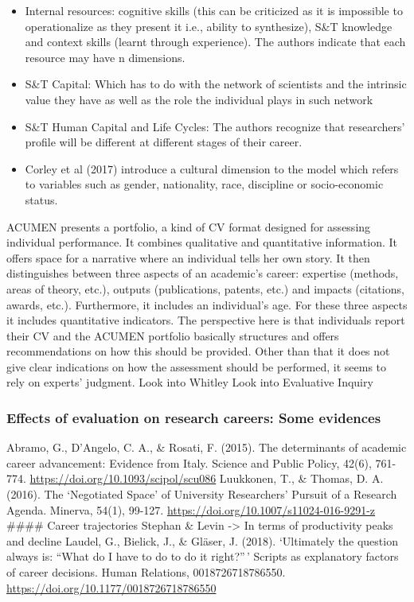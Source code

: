 \documentclass[]{article}
\providecommand{\tightlist}{%
  \setlength{\itemsep}{0pt}\setlength{\parskip}{0pt}}
\begin{document}
\begin{itemize}
\tightlist
\item
  Internal resources: cognitive skills (this can be criticized as it is
  impossible to operationalize as they present it i.e., ability to
  synthesize), S\&T knowledge and context skills (learnt through
  experience). The authors indicate that each resource may have n
  dimensions.
\item
  S\&T Capital: Which has to do with the network of scientists and the
  intrinsic value they have as well as the role the individual plays in
  such network
\item
  S\&T Human Capital and Life Cycles: The authors recognize that
  researchers' profile will be different at different stages of their
  career.
\item
  Corley et al (2017) introduce a cultural dimension to the model which
  refers to variables such as gender, nationality, race, discipline or
  socio-economic status.
\end{itemize}

ACUMEN presents a portfolio, a kind of CV format designed for assessing
individual performance. It combines qualitative and quantitative
information. It offers space for a narrative where an individual tells
her own story. It then distinguishes between three aspects of an
academic's career: expertise (methods, areas of theory, etc.), outputs
(publications, patents, etc.) and impacts (citations, awards, etc.).
Furthermore, it includes an individual's age. For these three aspects it
includes quantitative indicators. The perspective here is that
individuals report their CV and the ACUMEN portfolio basically
structures and offers recommendations on how this should be provided.
Other than that it does not give clear indications on how the assessment
should be performed, it seems to rely on experts' judgment. Look into
Whitley Look into Evaluative Inquiry

\subsubsection{Effects of evaluation on research careers: Some
evidences}\label{effects-of-evaluation-on-research-careers-some-evidences}

Abramo, G., D'Angelo, C. A., \& Rosati, F. (2015). The determinants of
academic career advancement: Evidence from Italy. Science and Public
Policy, 42(6), 761-774. \url{https://doi.org/10.1093/scipol/scu086}
Luukkonen, T., \& Thomas, D. A. (2016). The `Negotiated Space' of
University Researchers' Pursuit of a Research Agenda. Minerva, 54(1),
99-127. \url{https://doi.org/10.1007/s11024-016-9291-z} \#\#\#\# Career
trajectories Stephan \& Levin -\textgreater{} In terms of productivity
peaks and decline Laudel, G., Bielick, J., \& Gläser, J. (2018).
`Ultimately the question always is: ``What do I have to do to do it
right?''\,' Scripts as explanatory factors of career decisions. Human
Relations, 0018726718786550.
\url{https://doi.org/10.1177/0018726718786550}
\end{document}
